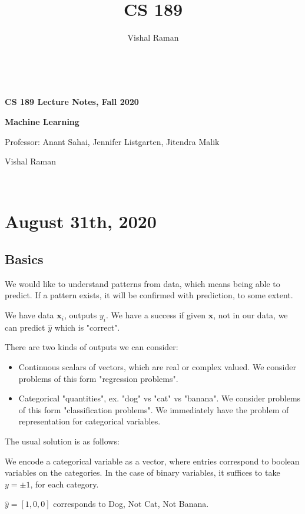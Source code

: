 \documentclass[11pt]{scrartcl}
\newcommand{\Vx}{\mathbf{x}}
\begin{document}
\title{CS 189}
\author{Vishal Raman}
\thispagestyle{empty}
$ $
\vfill
\begin{center}

\centerline{\huge \textbf{CS 189 Lecture Notes, Fall 2020}}
\centerline{\Large \textbf{Machine Learning} } 
\centerline{Professor: Anant Sahai, Jennifer Listgarten, Jitendra Malik}
\centerline{Vishal Raman}
\end{center}
\vfill
$ $
\newpage
\thispagestyle{empty}
\tableofcontents
\newpage
\section{August 31th, 2020}
\subsection{Basics}
We would like to understand patterns from data, which means being able to predict.  If a pattern exists, it will be confirmed with prediction, to some extent.

\begin{definition} We have data $\Vx_i$, outputs $y_i$. We have a success if given $\Vx$, not in our data, we can predict $\hat{y}$ which is "correct".
\end{definition}

There are two kinds of outputs we can consider:
\begin{itemize}
\item Continuous scalars of vectors, which are real or complex valued.  We consider problems of this form "regression problems".
\item Categorical "quantities", ex. "dog" vs "cat" vs "banana".  We consider problems of this form "classification problems".  We immediately have the problem of representation for categorical variables.
\end{itemize}

The usual solution is as follows:
\begin{definition} We encode a categorical variable as a vector, where entries correspond to boolean variables on the categories.   In the case of binary variables, it suffices to take $y = \pm 1$, for each category.
\end{definition}
\begin{example} $\hat{y} = [1, 0, 0]$ corresponds to Dog, Not Cat, Not Banana.  
\end{example}
\end{document}
